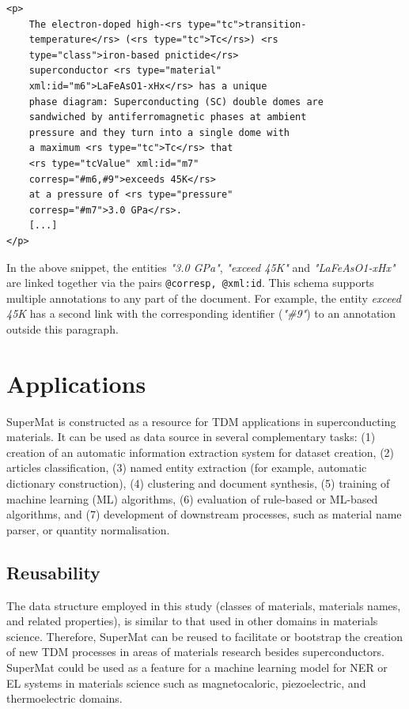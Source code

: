 \documentclass[fleqn,10pt]{wlscirep}
\begin{document}
\begin{verbatim}
<p>
    The electron-doped high-<rs type="tc">transition-
    temperature</rs> (<rs type="tc">Tc</rs>) <rs 
    type="class">iron-based pnictide</rs> 
    superconductor <rs type="material" 
    xml:id="m6">LaFeAsO1-xHx</rs> has a unique 
    phase diagram: Superconducting (SC) double domes are 
    sandwiched by antiferromagnetic phases at ambient 
    pressure and they turn into a single dome with 
    a maximum <rs type="tc">Tc</rs> that 
    <rs type="tcValue" xml:id="m7" 
    corresp="#m6,#9">exceeds 45K</rs> 
    at a pressure of <rs type="pressure" 
    corresp="#m7">3.0 GPa</rs>. 
    [...]
</p>
\end{verbatim}

In the above snippet, the entities \textit{"3.0 GPa"}, \textit{"exceed 45K"} and \textit{"LaFeAsO1-xHx"} are linked together via the pairs \texttt{@corresp, @xml:id}. 
This schema supports multiple annotations to any part of the document. 
For example, the entity \textit{exceed 45K} has a second link with the corresponding identifier (\textit{"\#9"}) to an annotation outside this paragraph.


\section*{Applications}
\label{sec:applications}
SuperMat is constructed as a resource for TDM applications in superconducting materials. It can be used as data source in several complementary tasks: 
(1) creation of an automatic information extraction system for dataset creation,
(2) articles classification, 
(3) named entity extraction (for example, automatic dictionary construction), 
(4) clustering and document synthesis,
(5) training of machine learning (ML) algorithms,
(6) evaluation of rule-based or ML-based algorithms, and 
(7) development of downstream processes, such as material name parser, or quantity normalisation.

\subsection*{Reusability}
The data structure employed in this study (classes of materials, materials names, and related properties), is similar to that used in other domains in materials science. 
Therefore, SuperMat can be reused to facilitate or bootstrap the creation of new TDM processes in areas of materials research besides superconductors.
SuperMat could be used as a feature for a machine learning model for NER or EL systems in materials science such as magnetocaloric, piezoelectric, and thermoelectric domains.  
\end{document}
